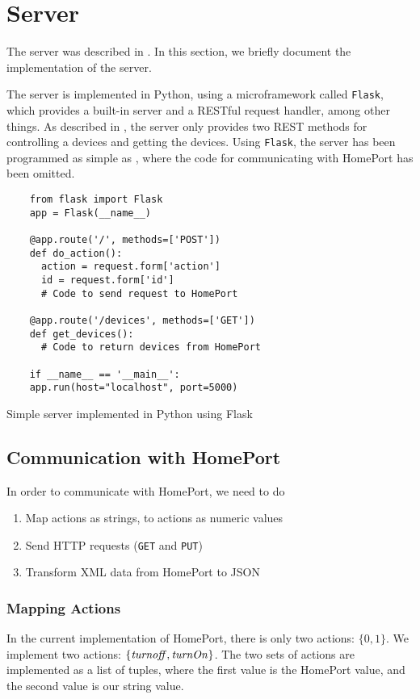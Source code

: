 \section{Server}
The server was described in . 
In this section, we briefly document the implementation of the server.

The server is implemented in Python,
using a microframework called \texttt{Flask},
which provides a built-in server and a RESTful request handler, among other things. 
As described in , 
the server only provides two REST methods for controlling a devices and getting the devices. 
Using \texttt{Flask}, the server has been programmed as simple as , 
where the code for communicating with HomePort has been omitted. 

\begin{listing}
  \begin{verbatim}
    from flask import Flask
    app = Flask(__name__)
    
    @app.route('/', methods=['POST'])
    def do_action():
      action = request.form['action']
      id = request.form['id']
      # Code to send request to HomePort
      
    @app.route('/devices', methods=['GET'])
    def get_devices():
      # Code to return devices from HomePort
    
    if __name__ == '__main__':
    app.run(host="localhost", port=5000)
  \end{verbatim}
  \caption{Simple server implemented in Python using Flask}
  \label{lst:server}
\end{listing}

\subsection{Communication with HomePort}
In order to communicate with HomePort, 
we need to do
\begin{enumerate}
  \item Map actions as strings, to actions as numeric values
  \item Send HTTP requests (\texttt{GET} and \texttt{PUT})
  \item Transform XML data from HomePort to JSON
\end{enumerate}

\subsubsection{Mapping Actions}
In the current implementation of HomePort, 
there is only two actions: $\{0, 1\}$.
We implement two actions: $\{\var{turnoff}, \var{turnOn}\}$. 
The two sets of actions are implemented as a list of tuples, 
where the first value is the HomePort value, 
and the second value is our string value. 


